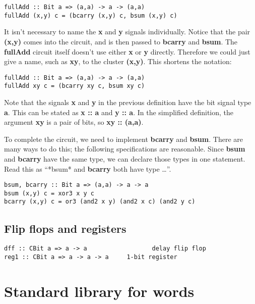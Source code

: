 \documentclass[11pt]{article}
\begin{document}
\begin{verbatim}
fullAdd :: Bit a => (a,a) -> a -> (a,a)
fullAdd (x,y) c = (bcarry (x,y) c, bsum (x,y) c)
\end{verbatim}


It isn't necessary to name the \textbf{x} and \textbf{y} signals individually.
Notice that the pair \textbf{(x,y)} comes into the circuit, and is then
passed to \textbf{bcarry} and \textbf{bsum}.  The \textbf{fullAdd} circuit itself doesn't
use either \textbf{x} or \textbf{y} directly.  Therefore we could just give a name,
such as \textbf{xy}, to the cluster \textbf{(x,y)}.  This shortens the notation:


\begin{verbatim}
fullAdd :: Bit a => (a,a) -> a -> (a,a)
fullAdd xy c = (bcarry xy c, bsum xy c)
\end{verbatim}



Note that the signals \textbf{x} and \textbf{y} in the previous definition have the
bit signal type \textbf{a}.  This can be stated as \textbf{x :: a} and \textbf{y :: a}.  In
the simplified definition, the argument \textbf{xy} is a pair of bits, so \textbf{xy
:: (a,a)}.

To complete the circuit, we need to implement \textbf{bcarry} and \textbf{bsum}.
There are many ways to do this; the following specifications are
reasonable.  Since \textbf{bsum} and \textbf{bcarry} have the same type, we can
declare those types in one statement.  Read this as ``*bsum* and
\textbf{bcarry} both have type \ldots{}''.


\begin{verbatim}
bsum, bcarry :: Bit a => (a,a) -> a -> a
bsum (x,y) c = xor3 x y c
bcarry (x,y) c = or3 (and2 x y) (and2 x c) (and2 y c)
\end{verbatim}

\subsection{Flip flops and registers}
\label{sec:orgedeec7d}


\begin{verbatim}
dff :: CBit a => a -> a                  delay flip flop
reg1 :: CBit a => a -> a -> a     1-bit register
\end{verbatim}


\section{Standard library for words}
\label{sec:org433f6a6}
\end{document}
